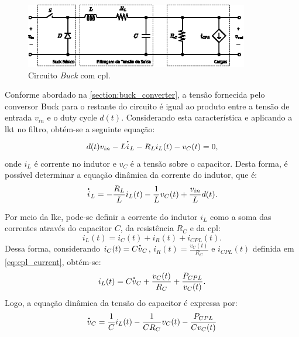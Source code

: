 \begin{figure}[H]
  \centering
  \captionsetup{justification=centering}
  \includegraphics[width=0.87\textwidth]{figuras/buck_converter_circuit.eps}
  \caption{Circuito \textit{Buck} com \acrshort{cpl}.}
  \label{fig:circuit1}
\end{figure}

Conforme abordado na \autoref{section:buck_converter}, a tensão fornecida pelo conversor Buck para o restante do circuito é igual ao produto entre a tensão de entrada $v_{in}$ e o duty cycle $d(t)$. Considerando esta característica e aplicando a \acrfull{lkt} no filtro, obtém-se a seguinte equação: \begin{equation} d(t)v_{in} - L \dt{i}_L - R_L i_L(t) - v_C(t) = 0, \end{equation} onde $i_L$ é corrente no indutor e $v_C$ é a tensão sobre o capacitor. Desta forma, é possível determinar a equação dinâmica da corrente do indutor, que é: \begin{equation} \dt{i}_L = - \frac{R_L}{L} i_L(t) - \frac{1}{L} v_C(t) + \frac{v_{in}}{L}d(t). \label{eq:buck_converter_current} \end{equation}

Por meio da \acrfull{lkc}, pode-se definir a corrente do indutor $i_{L}$ como a soma das correntes através do capacitor $C$, da resistência $R_C$ e da \acrshort{cpl}: \begin{equation} i_L(t) = i_C(t) + i_R(t) + i_{CPL}(t). \end{equation} Dessa forma, considerando $i_C(t) = C\dt{v}_C$, $i_R(t) = \frac{v_C(t)}{R_C}$ e $i_{CPL}(t)$ definida em \eqref{eq:cpl_current}, obtém-se: \begin{equation} i_L(t) = C\dt{v}_C + \frac{v_C(t)}{R_C} + \frac{P_{CPL}}{v_C(t)}. \end{equation} Logo, a equação dinâmica da tensão do capacitor é expressa por: \begin{equation} \dt{v}_C = \frac{1}{C} i_L(t) - \frac{1}{CR_C}v_C(t) - \frac{P_{CPL}}{Cv_C(t)} \label{eq:buck_converter_voltage} \end{equation}

